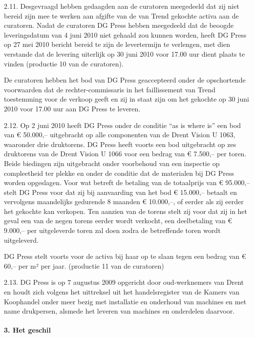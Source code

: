 \documentclass[
  dutch,
  a4paper,
]{article}
\begin{document}
2.11. Desgevraagd hebben gedaagden aan de curatoren meegedeeld dat zij niet bereid zijn mee te werken aan afgifte van de van Trend gekochte activa aan de curatoren. Nadat de curatoren DG Press hebben meegedeeld dat de beoogde leveringsdatum van 4 juni 2010 niet gehaald zou kunnen worden, heeft DG Press op 27 mei 2010 bericht bereid te zijn de levertermijn te verlengen, met dien verstande dat de levering uiterlijk op 30 juni 2010 voor 17.00 uur dient plaats te vinden (productie 10 van de curatoren).

De curatoren hebben het bod van DG Press geaccepteerd onder de opschortende voorwaarden dat de rechter-commissaris in het faillissement van Trend toestemming voor de verkoop geeft en zij in staat zijn om het gekochte op 30 juni 2010 voor 17.00 uur aan DG Press te leveren.

2.12. Op 2 juni 2010 heeft DG Press onder de conditie ``as is where is'' een bod van € 50.000,-- uitgebracht op alle componenten van de Drent Vision U 1063, waaronder drie druktorens. DG Press heeft voorts een bod uitgebracht op zes druktorens van de Drent Vision U 1066 voor een bedrag van € 7.500,-- per toren. Beide biedingen zijn uitgebracht onder voorbehoud van een inspectie op compleetheid ter plekke en onder de conditie dat de materialen bij DG Press worden opgeslagen. Voor wat betreft de betaling van de totaalprijs van € 95.000,-- stelt DG Press voor dat zij bij aanvaarding van het bod € 15.000,-- betaalt en vervolgens maandelijks gedurende 8 maanden € 10.000,--, of eerder als zij eerder het gekochte kan verkopen. Ten aanzien van de torens stelt zij voor dat zij in het geval een van de negen torens eerder wordt verkocht, een deelbetaling van € 9.000,-- per uitgeleverde toren zal doen zodra de betreffende toren wordt uitgeleverd.

DG Press stelt voorts voor de activa bij haar op te slaan tegen een bedrag van € 60,-- per m² per jaar. (productie 11 van de curatoren)

2.13. DG Press is op 7 augustus 2009 opgericht door oud-werknemers van Drent en houdt zich volgens het uittreksel uit het handelsregister van de Kamers van Koophandel onder meer bezig met installatie en onderhoud van machines en met name drukpersen, alsmede het leveren van machines en onderdelen daarvoor.

\paragraph{3. Het geschil}\label{het-geschil-2}
\end{document}
